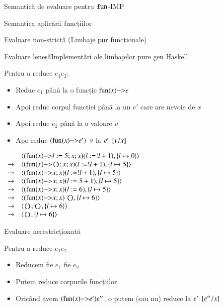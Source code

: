 \documentclass[xcolor=pdftex,romanian,colorlinks]{beamer}
\begin{document}
\begin{section}{Semantică de evaluare pentru $\mathrel{\text{\ttfamily fun}}$-IMP}
\begin{subsection}{Semantica aplicării funcțiilor}
\begin{frame}{Evaluare non-strictă (Limbaje pur funcționale)}
\end{frame}

\begin{frame}{Evaluare leneșă}{Implementări ale limbajelor pure gen Haskell}
\begin{block}{}
Pentru a reduce $e_1 \mathrel{} e_2$:
\begin{itemize}
\item  Reduc $e_1$ până la o funcție
$\fun{x}{e}$
\item Apoi reduc corpul funcției  până la un $e'$ care are nevoie de $x$
\item Apoi reduc $e_2$ până la o valoare $v$
\item Apo reduc $(\fun{x}{e'})\mathrel{} v$ la $e'\mathbin{}[v/x]$

\end{itemize}
\end{block}
\hfill $\begin{array}{ll}
& \c{(\fun{x}{l := 5 ; x ; x}) (l := !l + 1), \{l \mapsto 0\}} \\
\rightarrow& \c{(\fun{x}{\Sskip ; x ; x}) (l := !l + 1), \{l \mapsto 5\}} \\
\rightarrow& \c{(\fun{x}{x ; x}) (l := !l + 1), \{l \mapsto 5\}} \\
\rightarrow& \c{(\fun{x}{x ; x}) (l := 5 + 1), \{l \mapsto 5\}} \\
\rightarrow& \c{(\fun{x}{x ; x}) (l := 6), \{l \mapsto 5\}} \\
\rightarrow& \c{(\fun{x}{x ; x}) \Sskip, \{l \mapsto 6\}} \\
\rightarrow& \c{\Sskip ; \Sskip, \{l \mapsto 6\}} \\
\rightarrow& \c{\Sskip, \{l \mapsto 6\}} \\
\end{array}$ \hfill\;

\end{frame}


\begin{frame}{Evaluare nerestricționată}
\begin{block}{}
Pentru a reduce $e_1 \mathrel{} e_2$
\begin{itemize}
\item Reducem fie $e_1$ fie $e_2$
\item Putem reduce corpurile funcțiilor
\item Oricând avem  $(\fun{x}{e'}) e''$, o putem (sau nu)
reduce la $e'\mathbin{}[e''/x]$
\end{itemize} 
\end{block}
\end{frame}


\end{subsection}
\end{section}
\end{document}
